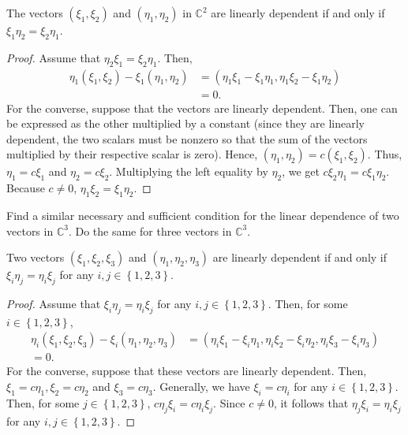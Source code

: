 \documentclass[12pt]{article}
\newenvironment{problem}[2][Problem]{\begin{trivlist} \item[\hskip \labelsep {\bfseries #1}\hskip \labelsep {\bfseries #2.}]}{\end{trivlist}}
\newenvironment{solution}[1][Solution]{\begin{trivlist} \item[\hskip \labelsep {\bfseries #1}]}{\end{trivlist}}
\begin{document}
\begin{problem}{5}
\begin{enumerate}
  \item The vectors $(\xi_{1},\xi_{2})$ and $(\eta_{1},\eta_{2})$ in $\mathbb{C}^{2}$ are linearly dependent if and only if $\xi_{1}\eta_{2} = \xi_{2}\eta_{1}$.
\begin{proof}
  Assume that $\eta_{2}\xi_{1} = \xi_{2}\eta_{1}$. Then, 
\begin{align*}
  \eta_{1} (\xi_{1},\xi_{2}) - \xi_{1}(\eta_{1},\eta_{2}) &= (\eta_{1}\xi_{1}-\xi_{1}\eta_{1}, \eta_{1}\xi_{2}-\xi_{1}\eta_{2})\\
  &= 0.
\end{align*}
For the converse, suppose that the vectors are linearly dependent. Then, one can be expressed as the other multiplied by a constant (since they are linearly dependent, the two scalars must be nonzero so that the sum of the vectors multiplied by their respective scalar is zero). Hence, $(\eta_{1},\eta_{2}) = c(\xi_{1},\xi_{2})$. Thus, $\eta_{1} = c\xi_{1}$ and $\eta_{2} = c\xi_{2}$. Multiplying the left equality by $\eta_{2}$, we get $c\xi_{2}\eta_{1} = c\xi_{1}\eta_{2}$. Because $c\neq 0$, $\eta_{1}\xi_{2} = \xi_{1}\eta_{2}$. 
\end{proof}
  \item Find a similar necessary and sufficient condition for the linear dependence of two vectors in $\mathbb{C}^{3}$. Do the same for three vectors in $\mathbb{C}^{3}$.
\begin{solution}
  Two vectors $(\xi_{1},\xi_{2},\xi_{3})$ and $(\eta_{1},\eta_{2},\eta_{3})$ are linearly dependent if and only if $\xi_{i}\eta_{j} = \eta_{i}\xi_{j}$ for any $i,j\in \left\{ 1,2,3 \right\}$. 
\begin{proof}
  Assume that $\xi_{i}\eta_{j} = \eta_{i}\xi_{j}$ for any $i,j\in \left\{ 1,2,3 \right\}$. Then, for some $i\in \left\{ 1,2,3 \right\}$, 
\begin{align*}
  \eta_{i}(\xi_{1},\xi_{2},\xi_{3}) - \xi_{i}(\eta_{1},\eta_{2},\eta_{3}) &= (\eta_{i}\xi_{1} - \xi_{i}\eta_{1}, \eta_{i}\xi_{2} - \xi_{i}\eta_{2}, \eta_{i}\xi_{3} - \xi_{i}\eta_{3})\\
  =0.
\end{align*}
For the converse, suppose that these vectors are linearly dependent. Then, $\xi_{1} = c\eta_{1}, \xi_{2} = c\eta_{2}$ and $\xi_{3} = c\eta_{3}$. Generally, we have $\xi_{i} = c\eta_{i}$ for any $i\in \left\{ 1,2,3 \right\}$. Then, for some $j\in \left\{ 1,2,3 \right\}$, $c\eta_{j}\xi_{i} = c\eta_{i}\xi_{j}$. Since $c\neq 0$, it follows that $\eta_{j}\xi_{i} = \eta_{i}\xi_{j}$ for any $i,j\in \left\{ 1,2,3 \right\}$.

\end{proof}
\end{solution}
\end{enumerate}
\end{problem}
\end{document}
